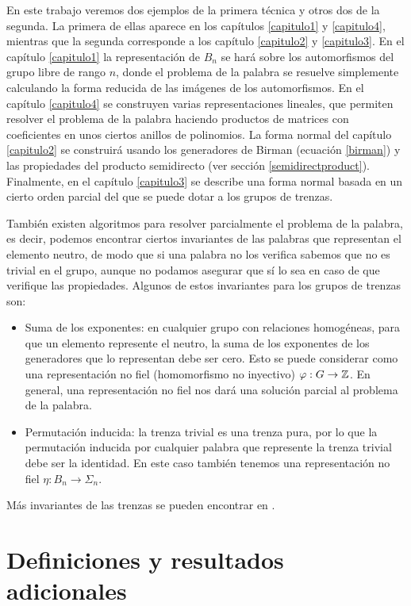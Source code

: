 \documentclass[TFG.tex]{subfiles}
\begin{document}
En este trabajo veremos dos ejemplos de la primera técnica y otros dos de la segunda. La primera de ellas aparece en los capítulos \ref{capitulo1} y \ref{capitulo4}, mientras que la segunda corresponde a los capítulo \ref{capitulo2} y \ref{capitulo3}. En el capítulo \ref{capitulo1} la representación de $B_n$ se hará sobre los automorfismos del grupo libre de rango $n$, donde el problema de la palabra se resuelve simplemente calculando la forma reducida de las imágenes de los automorfismos. En el capítulo \ref{capitulo4} se construyen varias representaciones lineales, que permiten resolver el problema de la palabra haciendo productos de matrices con coeficientes en unos ciertos anillos de polinomios. La forma normal del capítulo \ref{capitulo2} se construirá usando los generadores de Birman (ecuación \ref{birman}) y las propiedades del producto semidirecto (ver sección \ref{semidirectproduct}). Finalmente, en el capítulo \ref{capitulo3} se describe una forma normal basada en un cierto orden parcial del que se puede dotar a los grupos de trenzas.

También existen algoritmos para resolver parcialmente el problema de la palabra, es decir, podemos encontrar ciertos invariantes de las palabras que representan el elemento neutro, de modo que si una palabra no los verifica sabemos que no es trivial en el grupo, aunque no podamos asegurar que sí lo sea en caso de que verifique las propiedades. Algunos de estos invariantes para los grupos de trenzas son:
\begin{itemize}
\item Suma de los exponentes: en cualquier grupo con relaciones homogéneas, para que un elemento represente el neutro, la suma de los exponentes de los generadores que lo representan debe ser cero. Esto se puede considerar como una representación no fiel (homomorfismo no inyectivo) $\varphi:G\to \mathbb{Z}$. En general, una representación no fiel nos dará una solución parcial al problema de la palabra.
\item Permutación inducida: la trenza trivial es una trenza pura, por lo que la permutación inducida por cualquier palabra que represente la trenza trivial debe ser la identidad. En este caso también tenemos una representación no fiel $\eta:B_n\to \Sigma_n$. 
\end{itemize}

Más invariantes de las trenzas se pueden encontrar en \cite{invariants}.

\section{Definiciones y resultados adicionales}
\end{document}
